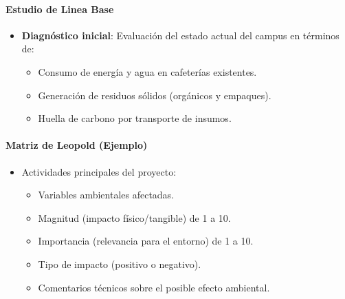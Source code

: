 \documentclass[letterpaper, 11pt]{report}
\begin{document}
\paragraph{Estudio de Linea Base}
\begin{itemize}
      \item \textbf{Diagnóstico inicial}: Evaluación del estado actual del campus en 
      términos de: 
            \begin{itemize}
                  \item Consumo de energía y agua en cafeterías existentes. 
                  \item Generación de residuos sólidos (orgánicos y empaques). 
                  \item Huella de carbono por transporte de insumos. 
            \end{itemize}
\end{itemize}

\paragraph{Matriz de Leopold (Ejemplo)}

\begin{itemize}
      \item Actividades principales del proyecto: \begin{itemize}
            \item Variables ambientales afectadas. 
            \item Magnitud (impacto físico/tangible) de 1 a 10. 
            \item Importancia (relevancia para el entorno) de 1 a 10. 
            \item Tipo de impacto (positivo o negativo). 
            \item Comentarios técnicos sobre el posible efecto ambiental. 
      \end{itemize}
\end{itemize}
\end{document}
